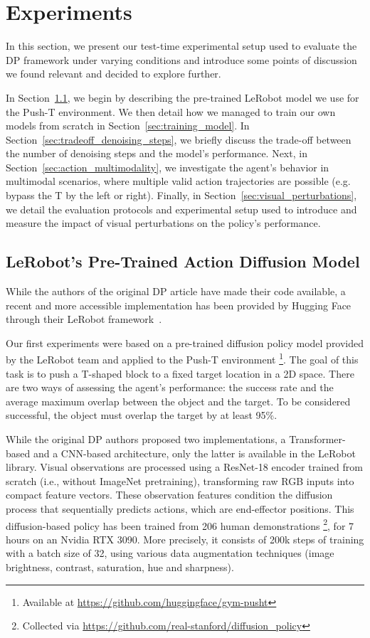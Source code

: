 \section{Experiments} \label{sec:experiments}
In this section, we present our test-time experimental setup used to evaluate the DP framework under varying conditions
and introduce some points of discussion we found relevant and decided to explore further.

In Section~\ref{sec:pretrained_model}, we begin by describing the pre-trained LeRobot model we use for the Push-T environment.
We then detail how we managed to train our own models from scratch in Section~\ref{sec:training_model}.
In Section~\ref{sec:tradeoff_denoising_steps}, we briefly discuss the trade-off between the number of denoising
steps and the model's performance.
Next, in Section~\ref{sec:action_multimodality}, we investigate the agent's behavior in multimodal scenarios, where multiple valid action trajectories are possible (e.g. bypass the T by the left or right).
Finally, in Section~\ref{sec:visual_perturbations}, we detail the evaluation protocols and experimental setup used to introduce and measure the impact of visual perturbations on the policy's performance.

\subsection{LeRobot's Pre-Trained Action Diffusion Model}\label{sec:pretrained_model}

While the authors of the original DP article have made their code available, a recent and more
accessible implementation has been provided by Hugging Face through their LeRobot
framework~\cite{cadene2024lerobot}.

Our first experiments were based on a pre-trained diffusion policy model provided by the LeRobot team
and applied to the Push-T environment
\footnote{Available at \url{https://github.com/huggingface/gym-pusht}}.
The goal of this task is to push a T-shaped block to a fixed target location in a 2D space. There are two
ways of assessing the agent's performance: the success rate and the average maximum overlap between the
object and the target. To be considered successful, the object must overlap the target by at least 95\%.

While the original DP authors proposed two implementations, a Transformer-based and a CNN-based architecture,
only the latter is available in the LeRobot library.
Visual observations are processed using a ResNet-18 encoder trained from scratch (i.e., without ImageNet
pretraining), transforming raw RGB inputs into compact feature vectors.
These observation features condition the diffusion process that sequentially predicts actions, which are
end-effector positions.
This diffusion-based policy has been trained from 206 human demonstrations
\footnote{Collected via \url{https://github.com/real-stanford/diffusion_policy}}, for 7 hours on
an Nvidia RTX 3090.
More precisely, it consists of 200k steps of training with a batch size of 32, using various data
augmentation techniques (image brightness, contrast, saturation, hue and sharpness).

